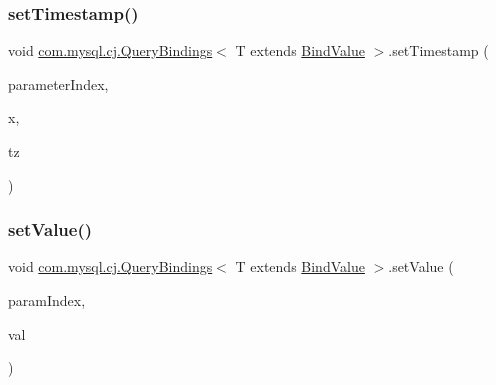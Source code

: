 \subsubsection{\texorpdfstring{set\+Timestamp()}{setTimestamp()}\hspace{0.1cm}{\footnotesize\ttfamily [3/3]}}
{\footnotesize\ttfamily void \mbox{\hyperlink{interfacecom_1_1mysql_1_1cj_1_1_query_bindings}{com.\+mysql.\+cj.\+Query\+Bindings}}$<$ T extends \mbox{\hyperlink{interfacecom_1_1mysql_1_1cj_1_1_bind_value}{Bind\+Value}} $>$.set\+Timestamp (\begin{DoxyParamCaption}\item[{int}]{parameter\+Index,  }\item[{Timestamp}]{x,  }\item[{Time\+Zone}]{tz }\end{DoxyParamCaption})}

\mbox{\label{interfacecom_1_1mysql_1_1cj_1_1_query_bindings_a514f5b8e5302409619be7ce0750b2c64}} 
\subsubsection{\texorpdfstring{set\+Value()}{setValue()}\hspace{0.1cm}{\footnotesize\ttfamily [1/4]}}
{\footnotesize\ttfamily void \mbox{\hyperlink{interfacecom_1_1mysql_1_1cj_1_1_query_bindings}{com.\+mysql.\+cj.\+Query\+Bindings}}$<$ T extends \mbox{\hyperlink{interfacecom_1_1mysql_1_1cj_1_1_bind_value}{Bind\+Value}} $>$.set\+Value (\begin{DoxyParamCaption}\item[{int}]{param\+Index,  }\item[{byte \mbox{[}$\,$\mbox{]}}]{val }\end{DoxyParamCaption})}

\mbox{\label{interfacecom_1_1mysql_1_1cj_1_1_query_bindings_a6faaa9fdb3d5ef5e04f6bacef9ab7fa3}} 
